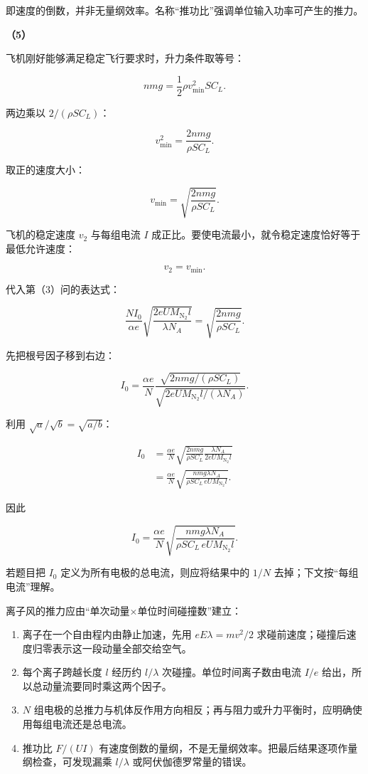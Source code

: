 \documentclass[12pt,a4paper,UTF8]{ctexart}
\newcommand{\tightlist}{\setlength{\itemsep}{0pt}\setlength{\parskip}{0pt}}
\begin{document}
即速度的倒数，并非无量纲效率。名称``推功比''强调单位输入功率可产生的推力。

\textbf{（5）}

飞机刚好能够满足稳定飞行要求时，升力条件取等号：

\[nmg=\frac12\rho v_{\min}^2SC_L.\]

两边乘以 \(2/(\rho SC_L)\)：

\[v_{\min}^2=\frac{2nmg}{\rho SC_L}.\]

取正的速度大小：

\[v_{\min}=\sqrt{\frac{2nmg}{\rho SC_L}}.\]

飞机的稳定速度 \(v_2\) 与每组电流 \(I\)
成正比。要使电流最小，就令稳定速度恰好等于最低允许速度：

\[v_2=v_{\min}.\]

代入第（3）问的表达式：

\[\frac{NI_0}{\alpha e}
\sqrt{\frac{2eUM_{\mathrm{N_2}}l}{\lambda N_A}}
=\sqrt{\frac{2nmg}{\rho SC_L}}.\]

先把根号因子移到右边：

\[I_0=\frac{\alpha e}{N}
\frac{\sqrt{2nmg/(\rho SC_L)}}
{\sqrt{2eUM_{\mathrm{N_2}}l/(\lambda N_A)}}.\]

利用 \(\sqrt a/\sqrt b=\sqrt{a/b}\)：

\[\begin{aligned}
I_0
&=\frac{\alpha e}{N}
\sqrt{
\frac{2nmg}{\rho SC_L}
\frac{\lambda N_A}{2eUM_{\mathrm{N_2}}l}
}\\
&=\frac{\alpha e}{N}
\sqrt{\frac{nmg\lambda N_A}
{\rho SC_L\,eUM_{\mathrm{N_2}}l}}.
\end{aligned}\]

因此

\[\boxed{
I_0=\frac{\alpha e}{N}
\sqrt{\frac{nmg\lambda N_A}
{\rho SC_L\,eU M_{\mathrm{N_2}}l}}
}.\]

若题目把 \(I_0\) 定义为所有电极的总电流，则应将结果中的 \(1/N\)
去掉；下文按``每组电流''理解。

离子风的推力应由``单次动量×单位时间碰撞数''建立：

\begin{enumerate}
\def\labelenumi{\arabic{enumi}.}
\tightlist
\item
  离子在一个自由程内由静止加速，先用 \(eE\lambda=mv^2/2\)
  求碰前速度；碰撞后速度归零表示这一段动量全部交给空气。
\item
  每个离子跨越长度 \(l\) 经历约 \(l/\lambda\)
  次碰撞。单位时间离子数由电流 \(I/e\)
  给出，所以总动量流要同时乘这两个因子。
\item
  \(N\)
  组电极的总推力与机体反作用方向相反；再与阻力或升力平衡时，应明确使用每组电流还是总电流。
\item
  推功比 \(F/(UI)\)
  有速度倒数的量纲，不是无量纲效率。把最后结果逐项作量纲检查，可发现漏乘
  \(l/\lambda\) 或阿伏伽德罗常量的错误。
\end{enumerate}
\end{document}
